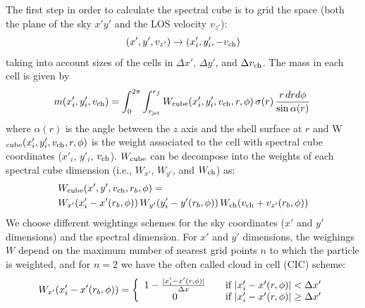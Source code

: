 \documentclass[12pt]{mythesis}
\begin{document}
The first step in order to calculate the spectral cube is to grid the space (both the plane of the sky $x'y'$ and the LOS velocity $v_{z'}$): 
\begin{equation}
	(x', y', v_{z'}) \rightarrow (x'_i, y'_i, -v_{\rm ch})
\end{equation}
taking into account sizes of the cells in $\Delta x'$, $\Delta y'$, and $\Delta v_{\rm ch}$. The mass in each cell is given by
\begin{equation}
	\label{eq:masscell}
	m(x'_i, y'_i, v_{\rm ch}) = %
	\int^{2\pi}_0\int^{r_f}_{r_{\rm jet}} W_{\rm cube}(x'_i, y'_i, v_{\rm ch}, r, \phi)\, \sigma(r)\, \frac{r\, dr d\phi}{\sin\alpha(r)}\, 
\end{equation}
where $\alpha(r)$ is the angle between the $z$ axis and the shell surface at $r$ and W$_{\rm cube}(x'_i, y'_i, v_{\rm ch}, r, \phi)$ is the weight associated to the cell with spectral cube coordinates ($x'_i$, $y'_i$, $v_{\rm ch}$). $W_{\rm cube}$ can be decompose into the weights of each spectral cube dimension (i.e., $W_{x'}$, $W_{y'}$, and $W_{\rm ch}$) as:
\begin{equation}
    \begin{split}
        &W_{\rm cube}(x', y', v_{\rm ch}, r_b, \phi) = \\
            &W_{x'}(x'_i - x'(r_b, \phi))\, W_{y'}(y'_i - y'(r_b,\phi))\, W_{\rm ch}(v_{\rm ch}+v_{z'}(r_b,\phi))
    \end{split}
\end{equation}
We choose different weightings schemes for the sky coordinates ($x'$ and $y'$ dimensions) and the spectral dimension. For $x'$ and $y'$ dimensions, the weighings $W$ depend on the maximum number of nearest grid points $n$ to which the particle is weighted, and for $n=2$ we have the often called cloud in cell (CIC) scheme:
\begin{equation}
W_{x'}(x'_i - x'(r_b, \phi)) = \left\{ 
  \begin{array}{ c l }
 1 - \frac{|x'_i - x'(r, \phi)|}{\Delta x} & \quad \textrm{if } |x'_i - x'(r, \phi)|< \Delta x' \\
    0                 & \quad \textrm{if } |x'_i - x'(r, \phi)|\geq \Delta x'
  \end{array}
\right.
\end{equation}
\end{document}
